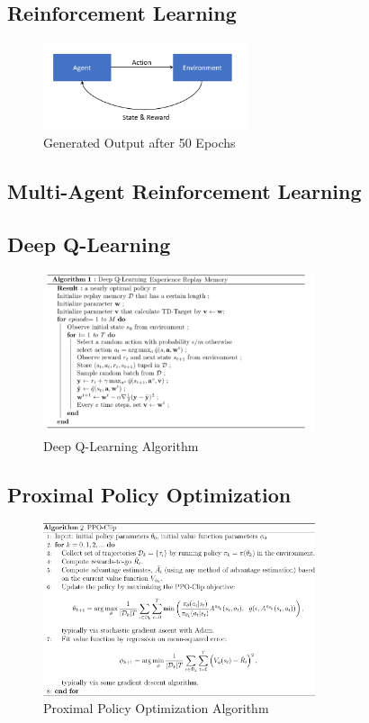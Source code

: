 \documentclass[conference]{IEEEtran}
\begin{document}
\subsection{Reinforcement Learning}

\begin{figure}[htbp]
\centerline{\includegraphics[width=60mm]{images/rl_diag.png}}
\caption{Generated Output after 50 Epochs}
\label{fig5}
\end{figure}

\subsection{Multi-Agent Reinforcement Learning}

\subsection{Deep Q-Learning}

\begin{figure}[htbp]
\centerline{\includegraphics[width=80mm]{images/DQN-Algorithm.png}}
\caption{Deep Q-Learning Algorithm}
\label{fig4}
\end{figure}

\subsection{Proximal Policy Optimization}

\begin{figure}[htbp]
\centerline{\includegraphics[width=80mm]{images/ppo_algorithm.png}}
\caption{Proximal Policy Optimization Algorithm}
\label{fig6}
\end{figure}
\end{document}
